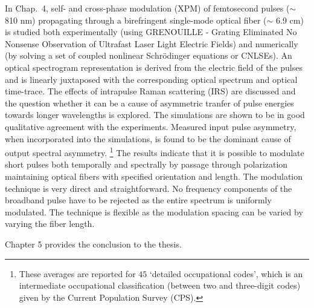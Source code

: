 In Chap.\ 4, self- and cross-phase modulation (XPM) of femtosecond pulses ($\sim$ 810
nm) propagating through a birefringent single-mode optical fiber ($\sim$ 6.9
cm) is studied both experimentally (using GRENOUILLE - Grating Eliminated
No Nonsense Observation of Ultrafast Laser Light Electric Fields)
and numerically
(by solving a set of coupled nonlinear Schr\"odinger equations or
CNLSEs). An optical spectrogram representation is derived from the
electric field of the pulses and is linearly juxtaposed with the
corresponding optical spectrum and optical time-trace. The effects of
intrapulse Raman scattering (IRS) are discussed and the question whether
it can be a cause of asymmetric tranfer of pulse energies towards longer
wavelengths is explored. The simulations are shown to be in good qualitative
agreement with the experiments. Measured input pulse asymmetry, when incorporated
into the simulations, is found to be the dominant cause of output spectral
asymmetry. \renewcommand{\baselinestretch}{1} \small\footnotesize
\footnote{These averages are reported
for $45$ `detailed occupational codes', which is an intermediate
occupational classification (between two and three-digit codes)
given by the Current Population Survey (CPS).}
\renewcommand{\baselinestretch}{2} \small\normalsize
The results indicate that it is possible to modulate short pulses both temporally and spectrally by passage through polarization maintaining
optical fibers with specified orientation and length. The modulation technique is very direct and straightforward. No frequency components of the broadband pulse have to be rejected as the entire spectrum is uniformly modulated. The technique is flexible as the modulation spacing can be varied by varying the fiber length.

Chapter 5 provides the conclusion to the thesis.
